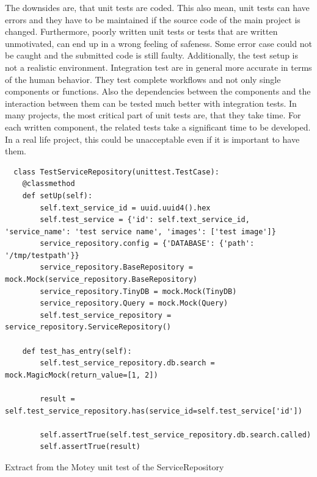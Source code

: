 The downsides are, that unit tests are coded.
This also mean, unit tests can have errors and they have to be maintained if the source code of the main project is changed.
Furthermore, poorly written unit tests or tests that are written unmotivated, can end up in a wrong feeling of safeness.
Some error case could not be caught and the submitted code is still faulty.
Additionally, the test setup is not a realistic environment.
Integration test are in general more accurate in terms of the human behavior.
They test complete workflows and not only single components or functions.
Also the dependencies between the components and the interaction between them can be tested much better with integration tests.
In many projects, the most critical part of unit tests are, that they take time.
For each written component, the related tests take a significant time to be developed.
In a real life project, this could be unacceptable even if it is important to have them.\newline

\begin{listing}[H]
  \begin{verbatim}
  class TestServiceRepository(unittest.TestCase):
    @classmethod
    def setUp(self):
        self.text_service_id = uuid.uuid4().hex
        self.test_service = {'id': self.text_service_id, 'service_name': 'test service name', 'images': ['test image']}
        service_repository.config = {'DATABASE': {'path': '/tmp/testpath'}}
        service_repository.BaseRepository = mock.Mock(service_repository.BaseRepository)
        service_repository.TinyDB = mock.Mock(TinyDB)
        service_repository.Query = mock.Mock(Query)
        self.test_service_repository = service_repository.ServiceRepository()

    def test_has_entry(self):
        self.test_service_repository.db.search = mock.MagicMock(return_value=[1, 2])

        result = self.test_service_repository.has(service_id=self.test_service['id'])

        self.assertTrue(self.test_service_repository.db.search.called)
        self.assertTrue(result)
  \end{verbatim}
  \caption{Extract from the Motey unit test of the ServiceRepository}
  \label{code:sample_unit_test}
\end{listing}

